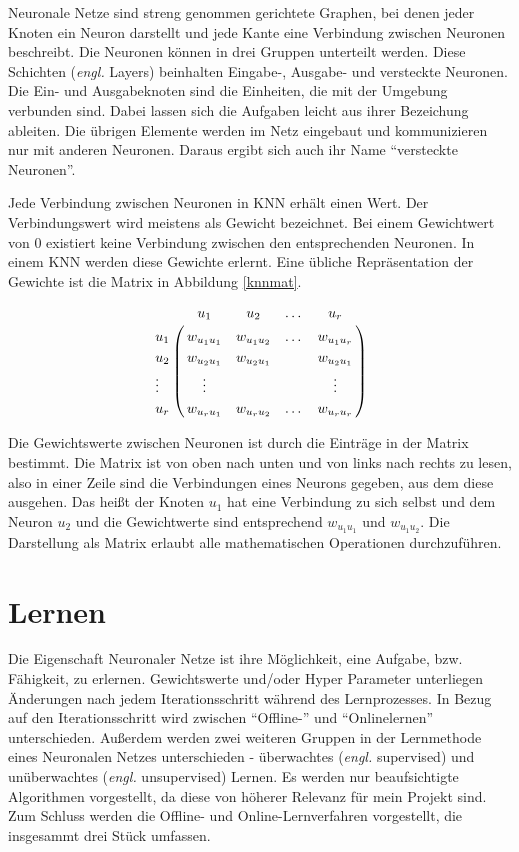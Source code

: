 Neuronale Netze sind streng genommen gerichtete Graphen, bei denen jeder Knoten ein Neuron darstellt und jede Kante eine Verbindung zwischen Neuronen beschreibt. Die Neuronen können in drei Gruppen unterteilt werden. Diese Schichten (\textit{engl.} Layers) beinhalten Eingabe-, Ausgabe- und versteckte Neuronen. Die Ein- und Ausgabeknoten sind die Einheiten, die mit der Umgebung verbunden sind. Dabei lassen sich die Aufgaben leicht aus ihrer Bezeichung ableiten. Die übrigen Elemente werden im Netz eingebaut und kommunizieren nur mit anderen Neuronen. Daraus ergibt sich auch ihr Name ``versteckte Neuronen''.

Jede Verbindung zwischen Neuronen in KNN erhält einen Wert. Der Verbindungswert wird meistens als Gewicht bezeichnet. Bei einem Gewichtwert von 0 existiert keine Verbindung zwischen den entsprechenden Neuronen. In einem KNN werden diese Gewichte erlernt. Eine übliche Repräsentation der Gewichte ist die Matrix in Abbildung \ref{knnmat}.

\begin{align}
\centering
\bordermatrix{ 	
	& u_1 			& u_2			 & \dots & u_r			    \cr
	u_1    & w_{u_{1}u_{1}} & w_{u_{1}u_{2}} & \dots & w_{u_{1}u_r}		\cr
	u_2	   & w_{u_{2}u_{1}} & w_{u_{2}u_{1}} & 	     & w_{u_{2}u_{1}}	\cr
	\vdots & \vdots	      	& 			     &       & \vdots			\cr
	u_r    & w_{u_{r}u_{1}} & w_{u_{r}u_{2}} & \dots & w_{u_{r}u_r}  	\cr 
}
\label{knnmat}
\end{align}

Die Gewichtswerte zwischen Neuronen ist durch die Einträge in der Matrix bestimmt. Die Matrix ist von oben nach unten und von links nach rechts zu lesen, also in einer Zeile sind die Verbindungen eines Neurons gegeben, aus dem diese ausgehen. Das heißt der Knoten $u_1$ hat eine Verbindung zu sich selbst und dem Neuron $u_2$ und die Gewichtwerte sind entsprechend $w_{u_{1}u_{1}}$ und $w_{u_{1}u_{2}}$. Die Darstellung als Matrix erlaubt alle mathematischen Operationen durchzuführen. \cite{CIKruse:15}

\section{Lernen} %
Die Eigenschaft Neuronaler Netze ist ihre Möglichkeit, eine Aufgabe, bzw. Fähigkeit, zu erlernen. Gewichtswerte und/oder Hyper Parameter unterliegen Änderungen nach jedem Iterationsschritt während des Lernprozesses. In Bezug auf den Iterationsschritt wird zwischen ``Offline-'' und ``Onlinelernen'' unterschieden. Außerdem werden zwei weiteren Gruppen in der Lernmethode eines Neuronalen Netzes unterschieden - überwachtes (\textit{engl.} supervised) und unüberwachtes (\textit{engl.} unsupervised) Lernen. Es werden nur beaufsichtigte Algorithmen vorgestellt, da diese von höherer Relevanz für mein Projekt sind. Zum Schluss werden die Offline- und Online-Lernverfahren vorgestellt, die insgesammt drei Stück umfassen.  \cite{CIKruse:15}

